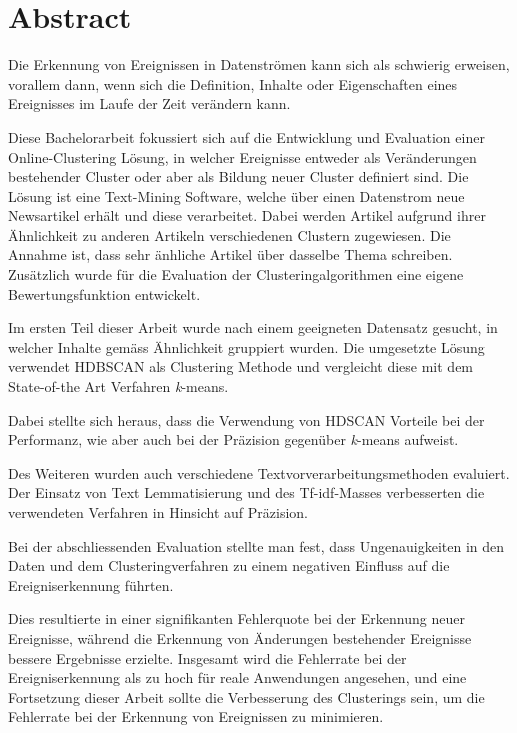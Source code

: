 
\section*{Abstract}

Die Erkennung von Ereignissen in Datenströmen kann sich als schwierig erweisen, vorallem dann,
wenn sich die Definition, Inhalte oder Eigenschaften eines Ereignisses im Laufe der Zeit verändern kann.

Diese Bachelorarbeit fokussiert sich auf die Entwicklung und Evaluation einer Online-Clustering Lösung,
in welcher Ereignisse entweder als Veränderungen bestehender Cluster oder aber als Bildung neuer Cluster
definiert sind.
Die Lösung ist eine Text-Mining Software, welche über einen Datenstrom neue Newsartikel erhält
und diese verarbeitet.
Dabei werden Artikel aufgrund ihrer Ähnlichkeit zu anderen Artikeln verschiedenen Clustern zugewiesen.
Die Annahme ist, dass sehr änhliche Artikel über dasselbe Thema schreiben.
Zusätzlich wurde für die Evaluation der Clusteringalgorithmen eine eigene Bewertungsfunktion entwickelt.

Im ersten Teil dieser Arbeit wurde nach einem geeigneten Datensatz gesucht,
in welcher Inhalte gemäss Ähnlichkeit gruppiert wurden.
Die umgesetzte Lösung verwendet HDBSCAN als Clustering Methode und vergleicht diese
mit dem State-of-the Art Verfahren \textit{k}-means.

Dabei stellte sich heraus, dass die Verwendung von HDSCAN Vorteile bei der Performanz,
wie aber auch bei der Präzision gegenüber \textit{k}-means aufweist.

Des Weiteren wurden auch verschiedene Textvorverarbeitungsmethoden evaluiert.
Der Einsatz von Text Lemmatisierung und des Tf-idf-Masses verbesserten
die verwendeten Verfahren in Hinsicht auf Präzision.

Bei der abschliessenden Evaluation stellte man fest,
dass Ungenauigkeiten in den Daten und dem Clusteringverfahren
zu einem negativen Einfluss auf die Ereigniserkennung führten.

Dies resultierte in einer signifikanten Fehlerquote bei der Erkennung neuer Ereignisse,
während die Erkennung von Änderungen bestehender Ereignisse bessere Ergebnisse erzielte.
Insgesamt wird die Fehlerrate bei der Ereigniserkennung als zu hoch für reale Anwendungen angesehen,
und eine Fortsetzung dieser Arbeit sollte die Verbesserung des Clusterings sein,
um die Fehlerrate bei der Erkennung von Ereignissen zu minimieren.
